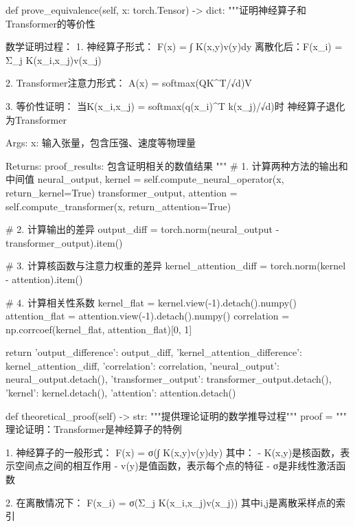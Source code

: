 \documentclass{MMCStyle}
\begin{document}
\begin{python}
    def prove_equivalence(self, x: torch.Tensor) -> dict:
        """证明神经算子和Transformer的等价性
        
        数学证明过程：
        1. 神经算子形式：
           F(x) = ∫ K(x,y)v(y)dy
           离散化后：F(x_i) = Σ_j K(x_i,x_j)v(x_j)
        
        2. Transformer注意力形式：
           A(x) = softmax(QK^T/√d)V
           
        3. 等价性证明：
           当K(x_i,x_j) = softmax(q(x_i)^T k(x_j)/√d)时
           神经算子退化为Transformer
        
        Args:
            x: 输入张量，包含压强、速度等物理量
            
        Returns:
            proof_results: 包含证明相关的数值结果
        """
        # 1. 计算两种方法的输出和中间值
        neural_output, kernel = self.compute_neural_operator(x, return_kernel=True)
        transformer_output, attention = self.compute_transformer(x, return_attention=True)
        
        # 2. 计算输出的差异
        output_diff = torch.norm(neural_output - transformer_output).item()
        
        # 3. 计算核函数与注意力权重的差异
        kernel_attention_diff = torch.norm(kernel - attention).item()
        
        # 4. 计算相关性系数
        kernel_flat = kernel.view(-1).detach().numpy()
        attention_flat = attention.view(-1).detach().numpy()
        correlation = np.corrcoef(kernel_flat, attention_flat)[0, 1]
        
        return {
            'output_difference': output_diff,
            'kernel_attention_difference': kernel_attention_diff,
            'correlation': correlation,
            'neural_output': neural_output.detach(),
            'transformer_output': transformer_output.detach(),
            'kernel': kernel.detach(),
            'attention': attention.detach()
        }
    
    def theoretical_proof(self) -> str:
        """提供理论证明的数学推导过程"""
        proof = """
        理论证明：Transformer是神经算子的特例
        
        1. 神经算子的一般形式：
           F(x) = σ(∫ K(x,y)v(y)dy)
           其中：
           - K(x,y)是核函数，表示空间点之间的相互作用
           - v(y)是值函数，表示每个点的特征
           - σ是非线性激活函数
        
        2. 在离散情况下：
           F(x_i) = σ(Σ_j K(x_i,x_j)v(x_j))
           其中i,j是离散采样点的索引
        

\end{python}
\end{document}
